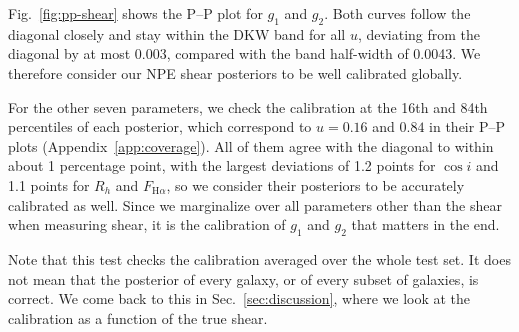 Fig.~\ref{fig:pp-shear} shows the P--P plot for $g_1$ and $g_2$. Both curves follow the diagonal closely and stay within the DKW band for all $u$, deviating from the diagonal by at most 0.003, compared with the band half-width of 0.0043. We therefore consider our NPE shear posteriors to be well calibrated globally.

For the other seven parameters, we check the calibration at the 16th and 84th percentiles of each posterior, which correspond to $u = 0.16$ and $0.84$ in their P--P plots (Appendix~\ref{app:coverage}). All of them agree with the diagonal to within about 1 percentage point, with the largest deviations of 1.2 points for $\cos i$ and 1.1 points for $R_h$ and $F_{\mathrm{H}\alpha}$, so we consider their posteriors to be accurately calibrated as well. Since we marginalize over all parameters other than the shear when measuring shear, it is the calibration of $g_1$ and $g_2$ that matters in the end.

Note that this test checks the calibration averaged over the whole test set. It does not mean that the posterior of every galaxy, or of every subset of galaxies, is correct. We come back to this in Sec.~\ref{sec:discussion}, where we look at the calibration as a function of the true shear.
